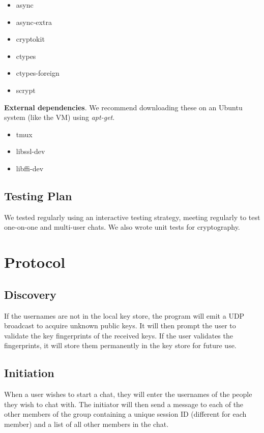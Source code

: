 \documentclass{scrartcl}
\begin{document}
\begin{itemize}
    \item async
    \item async-extra
    \item cryptokit
    \item ctypes
    \item ctypes-foreign
    \item scrypt
\end{itemize}

\textbf{External dependencies}. We recommend downloading these on an Ubuntu system (like the VM) using \textit{apt-get}.

\begin{itemize}
 \item tmux
 \item libssl-dev
 \item libffi-dev
\end{itemize}

\subsection{Testing Plan}
We tested regularly using an interactive testing strategy, meeting regularly to test one-on-one and multi-user chats. We also wrote unit tests for cryptography.

\section{Protocol}

\subsection{Discovery}

If the usernames are not in the local key store, the program will emit a UDP broadcast to acquire unknown public keys. It will then prompt the user to validate the key fingerprints of the received keys. If the user validates the fingerprints, it will store them permanently in the key store for future use.

\subsection{Initiation}
When a user wishes to start a chat, they will enter the usernames of the people they wish to chat with. The initiator will then send a message to each of the other members of the group containing a unique session ID (different for each member) and a list of all other members in the chat.\\
\end{document}
